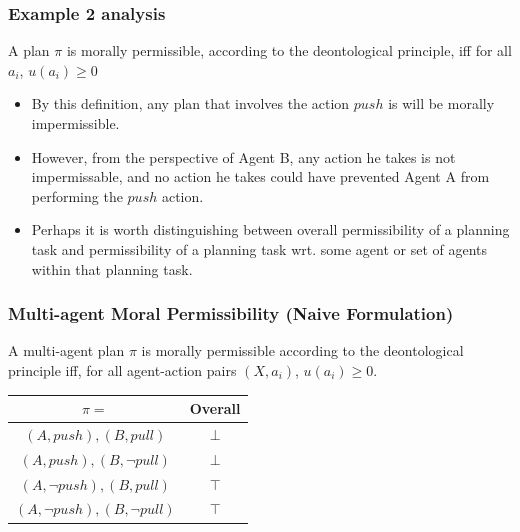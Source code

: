 \documentclass{beamer}
\begin{document}
\begin{frame}
\frametitle{Example 2 analysis}
\begin{definition}
A plan $\pi$ is morally permissible, according to the deontological principle, iff for all $a_i$, $u(a_i) \geq 0$
\end{definition}

\begin{itemize}
\item By this definition, any plan that involves the action $push$ is will be morally impermissible.
\item However, from the perspective of Agent B, any action he takes is not impermissable, and no action he takes could have prevented Agent A from performing the $push$ action.
\item Perhaps it is worth distinguishing between overall permissibility of a planning task and permissibility of a planning task wrt. some agent or set of agents within that planning task.
\end{itemize}
\end{frame}

\begin{frame}
\frametitle{Multi-agent Moral Permissibility (Naive Formulation)}
\begin{definition}
A multi-agent plan $\pi$ is morally permissible according to the deontological principle iff, for all agent-action pairs $(X,a_i)$, $u(a_i) \geq 0$.
\end{definition}


\begin{center}
\begin{tabular}{ |c|c| } 
 \hline
 $\pi=$ &  Overall \\ 
 \hline
 $(A,push), (B, pull)$ & $\bot$\\ 
 \hline
 $(A,push), (B, \lnot pull)$ & $\bot$\\ 
 \hline
 $(A,\lnot push), (B, pull)$ & $\top$\\ 
 \hline
 $(A,\lnot push), (B, \lnot pull)$ & $\top$\\ 
 \hline
\end{tabular}
\end{center}

\end{frame}
\end{document}
